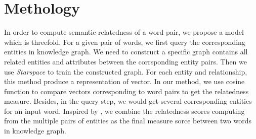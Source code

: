 \section{Methology}
\label{methology}
In order to compute semantic relatedness of a word pair, we propose a model which is
threefold. 
For a given pair of words, we first query the corresponding entities in knowledge graph.
We need to construct a specific graph contains all related entities and attributes between the 
corrsponding entity pairs. Then we use \emph{Starspace} to train the constructed 
graph. For each entity and relationship, this method produce a representation of vector.
In our method, we use cosine function to compare vectors corresponding to word pairs to get the relatedness measure.
Besides, in the query step, we would get several corresponding entities for an input word. Inspired by
\cite{acl/IacobacciPN15}, we combine the relatedness scores computing from the multiple pairs of entities 
as the final measure sorce between two words in knowledge graph.

\begin{table*}[]
    \small
    \centering
    \caption{Query Entity (DBPedia: http://dbpedia.org/resource/)}
    \label{entities}
    \renewcommand\arraystretch{1.6}
\end{table*}

